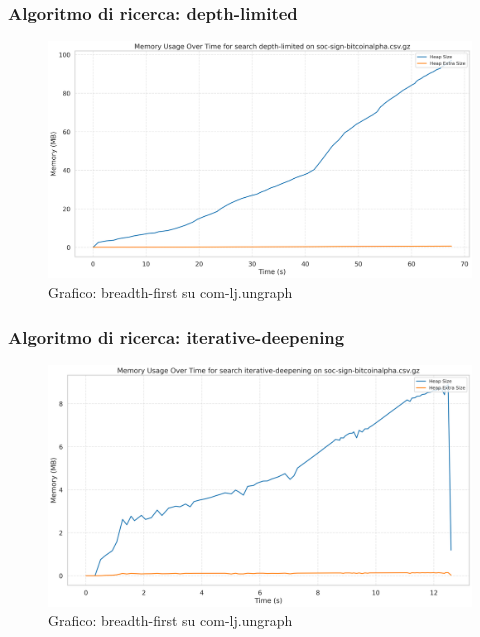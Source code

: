 \documentclass{article}
\begin{document}
\subsubsection{Algoritmo di ricerca: depth-limited}
\begin{figure}[htbp]\centering
\includegraphics[width=\textwidth]{../plots/soc-sign-bitcoinalpha.csv_depth-limited.png}
\caption{Grafico: breadth-first su com-lj.ungraph}
\end{figure}
\subsubsection{Algoritmo di ricerca: iterative-deepening}
\begin{figure}[htbp]\centering
\includegraphics[width=\textwidth]{../plots/soc-sign-bitcoinalpha.csv_iterative-deepening.png}
\caption{Grafico: breadth-first su com-lj.ungraph}
\end{figure}
\end{document}
